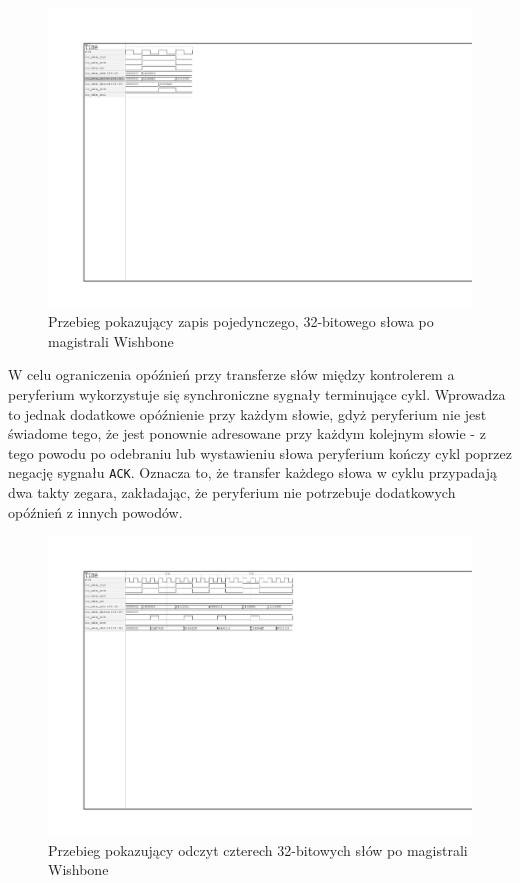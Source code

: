 \begin{figure}[H]
    \centering
    \includegraphics[scale=1.5,trim={2.54cm 14.73cm 19.6cm 2.9cm},clip]{implementation/classic-write.pdf}
    \caption{Przebieg pokazujący zapis pojedynczego, 32-bitowego słowa po magistrali Wishbone}
    \label{fig:wishbone-classic-write}
\end{figure}

W celu ograniczenia opóźnień przy transferze słów między kontrolerem a peryferium wykorzystuje się synchroniczne sygnały terminujące cykl. Wprowadza to jednak dodatkowe opóźnienie przy każdym słowie, gdyż peryferium nie jest świadome tego, że jest ponownie adresowane przy każdym kolejnym słowie - z tego powodu po odebraniu lub wystawieniu słowa peryferium kończy cykl poprzez negację sygnału \texttt{ACK}. Oznacza to, że transfer każdego słowa w cyklu przypadają dwa takty zegara, zakładając, że peryferium nie potrzebuje dodatkowych opóźnień z innych powodów.

\begin{figure}[H]
    \centering
    \includegraphics[scale=1,trim={2.54cm 14.37cm 13cm 2.9cm},clip]{implementation/classic-read-4.pdf}
    \caption{Przebieg pokazujący odczyt czterech 32-bitowych słów po magistrali Wishbone}
    \label{fig:wishbone-classic-read-4}
\end{figure}

